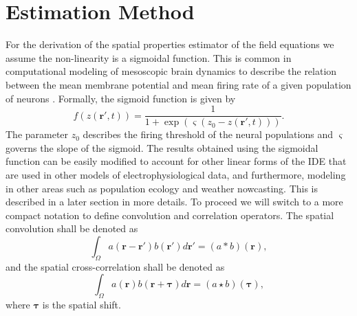 \documentclass[10pt,twocolumn,twoside]{IEEEtran}
\begin{document}
\section{Estimation Method}\label{sec:EstimationMethod}
For the derivation of the spatial properties estimator of the field equations we assume the non-linearity is a sigmoidal function. This is common in computational modeling of mesoscopic brain dynamics to describe the relation between the mean membrane potential and mean firing rate of a given population of neurons \cite{Freeman1975}. Formally, the sigmoid function is given by
\begin{equation}
	\label{ActivationFunction} f\left( z\left( \mathbf{r}', t \right) \right) = \frac{1}{1 + \exp \left( \varsigma \left( z_0 - z\left(\mathbf{r}',t\right) \right) \right)}. 
\end{equation}
The parameter $z_0$ describes the firing threshold of the neural populations and $\varsigma$ governs the slope of the sigmoid. The results obtained using the sigmoidal function can be easily modified to account for other linear forms of the IDE that are used in other models of electrophysiological data, and furthermore, modeling in other areas such as population ecology and weather nowcasting. This is described in a later section in more details. To proceed we will switch to a more compact notation to define convolution and correlation operators. The spatial convolution shall be denoted as
\begin{equation}
	\int_\Omega a(\mathbf{r}-\mathbf{r}')b(\mathbf{r}')d\mathbf{r}' = (a\ast b)(\mathbf{r}),
\end{equation}
and the spatial cross-correlation shall be denoted as 
\begin{equation}
	\int_\Omega a(\mathbf{r})b(\mathbf{r}+\boldsymbol{\tau})d\mathbf{r} = (a\star b)(\boldsymbol{\tau}),
\end{equation} 
where $\boldsymbol{\tau}$ is the spatial shift.
\end{document}
